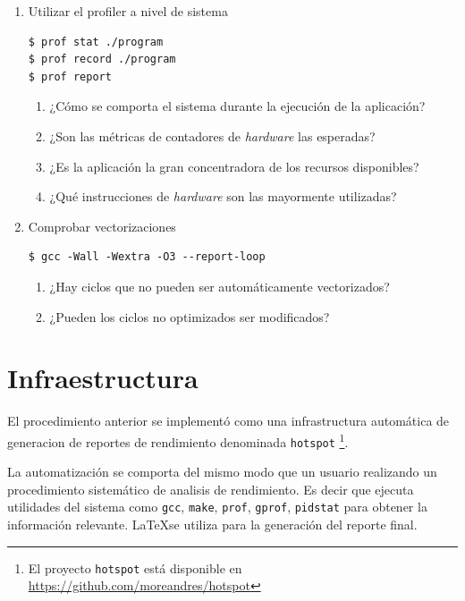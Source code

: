 \documentclass[a4paper]{report}
\begin{document}
\begin{enumerate}
\item Utilizar el profiler a nivel de sistema

\begin{lstlisting}[caption={Generación de Perfil de Sistema},label={lst:profall}]
$ prof stat ./program
$ prof record ./program
$ prof report
\end{lstlisting}

\begin{enumerate}
\item ¿Cómo se comporta el sistema durante la ejecución de la aplicación?
\item ¿Son las métricas de contadores de {\it hardware} las esperadas?
\item ¿Es la aplicación la gran concentradora de los recursos disponibles?
\item ¿Qué instrucciones de {\it hardware} son las mayormente utilizadas?
\end{enumerate}

\item Comprobar vectorizaciones

\begin{lstlisting}[caption={Información de Vectorización},label={lst:report}]
$ gcc -Wall -Wextra -O3 --report-loop
\end{lstlisting}

\begin{enumerate}
\item ¿Hay ciclos que no pueden ser automáticamente vectorizados?
\item ¿Pueden los ciclos no optimizados ser modificados?
\end{enumerate}

\end{enumerate}

\section{Infraestructura}

El procedimiento anterior se implementó como una infrastructura automática de generacion de reportes de rendimiento denominada 
{\tt hotspot} \footnote{El proyecto {\tt hotspot} está disponible en \href{https://github.com/moreandres/hotspot}{https://github.com/moreandres/hotspot}}.

\bigskip

La automatización se comporta del mismo modo que un usuario realizando un procedimiento sistemático de analisis de rendimiento.
Es decir que ejecuta utilidades del sistema como {\tt gcc}, {\tt make}, {\tt prof}, {\tt gprof}, {\tt pidstat} para obtener la información relevante.
\LaTeX se utiliza para la generación del reporte final.
\end{document}
